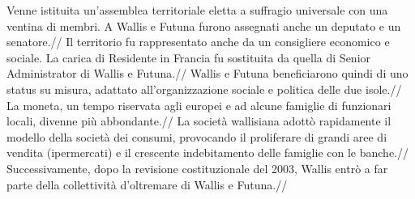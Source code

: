 \documentclass[fleqn,10pt]{SelfArx} %
\begin{document}
Venne istituita un'assemblea territoriale eletta a suffragio universale con una ventina di membri. A Wallis e Futuna furono assegnati anche un deputato e un senatore.// 
Il territorio fu rappresentato anche da un consigliere economico e sociale. La carica di Residente in Francia fu sostituita da quella di Senior Administrator di Wallis e Futuna.//
Wallis e Futuna beneficiarono quindi di uno status su misura, adattato all'organizzazione sociale e politica delle due isole.//
La moneta, un tempo riservata agli europei e ad alcune famiglie di funzionari locali, divenne più abbondante.//
La società wallisiana  adottò rapidamente il modello della società dei consumi, provocando il proliferare di grandi aree di vendita (ipermercati) e il crescente indebitamento delle famiglie con le banche.//
Successivamente, dopo la revisione costituzionale del 2003, Wallis entrò a far parte della collettività d'oltremare di Wallis e Futuna.//
\end{document}
